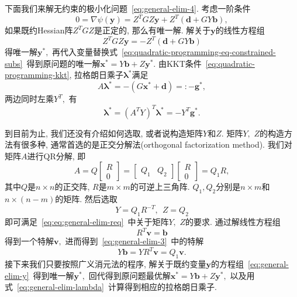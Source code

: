 \documentclass{SBCbookchapter}
\newcommand{\V}[1]{{\bm{#1}}}
\numberwithin{equation}{section}
\begin{document}
下面我们来解无约束的极小化问题~\eqref{eq:general-elim-4}. 考虑一阶条件
\begin{equation}
\label{eq:general-elim-5}
0 = \nabla \psi (\V{y}) = Z^T G Z \V{y} + Z^T \left( \V{d} + G Y \V{b} \right),
\end{equation}
如果既约Hessian阵$Z^T G Z$是正定的, 那么有唯一解. 解关于$\V{y}$的线性方程组
\begin{equation}
\label{eq:general-elim-y}
Z^T G Z \V{y} = - Z^T \left( \V{d} + G Y \V{b} \right)
\end{equation}
得唯一解$\V{y}^*,$ 再代入变量替换式~\eqref{eq:quadratic-programming-eq-constrained-subs}~得到原问题的唯一解$\V{x}^* = Y \V{b} + Z \V{y}^*.$ 由KKT条件~\eqref{eq:quadratic-programming-kkt}, 拉格朗日乘子$\V{\lambda}^*$满足
\begin{equation}
\label{eq:general-elim-lagrange}
A \V{\lambda}^* = -\left( G \V{x}^* + \V{d} \right) =: - \V{g}^*,
\end{equation}
两边同时左乘$Y^T,$ 有
\begin{equation}
\label{eq:general-elim-lambda}
\V{\lambda}^* = \left( A^T Y \right)^T \V{\lambda}^* = -Y^T \V{g}^*.
\end{equation}

到目前为止, 我们还没有介绍如何选取, 或者说构造矩阵$Y$和$Z.$ 矩阵$Y,$ $Z$的构造方法有很多种, 通常首选的是正交分解法(orthogonal factorization method). 我们对矩阵$A$进行QR分解, 即
\begin{equation}
\label{eq:quadratic-programming-qr-decomp-1}
A = Q \begin{bmatrix} R \\ 0 \end{bmatrix} = \begin{bmatrix} Q_1 & Q_2 \end{bmatrix} \begin{bmatrix} R \\ 0 \end{bmatrix} = Q_1 R,
\end{equation}
其中$Q$是$n \times n$的正交阵, $R$是$m \times m$的可逆上三角阵. $Q_1, Q_2$分别是$n \times m$和$n \times (n - m)$的矩阵. 然后选取
\begin{equation}
\label{eq:quadratic-programming-qr-decomp-2}
Y = Q_1 R^{-T}, ~~ Z = Q_2
\end{equation}
即可满足~\eqref{eq:eq:general-elim-req}~中关于矩阵$Y,$ $Z$的要求. 通过解线性方程组
\begin{equation*}
R^T \V{v} = \V{b}
\end{equation*}
得到一个特解$\V{v},$ 进而得到~\eqref{eq:general-elim-3}~中的特解
\begin{equation*}
Y \V{b} = Y R^T \V{v} = Q_1 \V{v}.
\end{equation*}
接下来我们只要按照广义消元法的程序, 解关于既约变量$\V{y}$的方程组~\eqref{eq:general-elim-y}~得到唯一解$\V{y}^*,$ 回代得到原问题最优解$\V{x}^* = Y \V{b} + Z \V{y}^*,$ 以及用式~\eqref{eq:general-elim-lambda}~计算得到相应的拉格朗日乘子.
\end{document}
